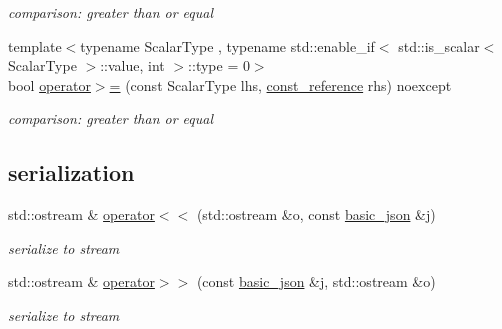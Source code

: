 \begin{DoxyCompactItemize}
\begin{DoxyCompactList}\small\item\em comparison\+: greater than or equal \end{DoxyCompactList}\item 
{\footnotesize template$<$typename Scalar\+Type , typename std\+::enable\+\_\+if$<$ std\+::is\+\_\+scalar$<$ Scalar\+Type $>$\+::value, int $>$\+::type  = 0$>$ }\\bool \hyperlink{classnlohmann_1_1basic__json_a5ee0e3e8afc7cbd932d6ed66418fa80a}{operator$>$=} (const Scalar\+Type lhs, \hyperlink{classnlohmann_1_1basic__json_a4057c5425f4faacfe39a8046871786ca}{const\+\_\+reference} rhs) noexcept
\begin{DoxyCompactList}\small\item\em comparison\+: greater than or equal \end{DoxyCompactList}\end{DoxyCompactItemize}
\subsection*{serialization}
\begin{DoxyCompactItemize}
\item 
std\+::ostream \& \hyperlink{classnlohmann_1_1basic__json_a5e34c5435e557d0bf666bd7311211405}{operator$<$$<$} (std\+::ostream \&o, const \hyperlink{classnlohmann_1_1basic__json}{basic\+\_\+json} \&j)
\begin{DoxyCompactList}\small\item\em serialize to stream \end{DoxyCompactList}\item 
std\+::ostream \& \hyperlink{classnlohmann_1_1basic__json_a34d6a60dd99e9f33b8273a1c8db5669b}{operator$>$$>$} (const \hyperlink{classnlohmann_1_1basic__json}{basic\+\_\+json} \&j, std\+::ostream \&o)
\begin{DoxyCompactList}\small\item\em serialize to stream \end{DoxyCompactList}\end{DoxyCompactItemize}
